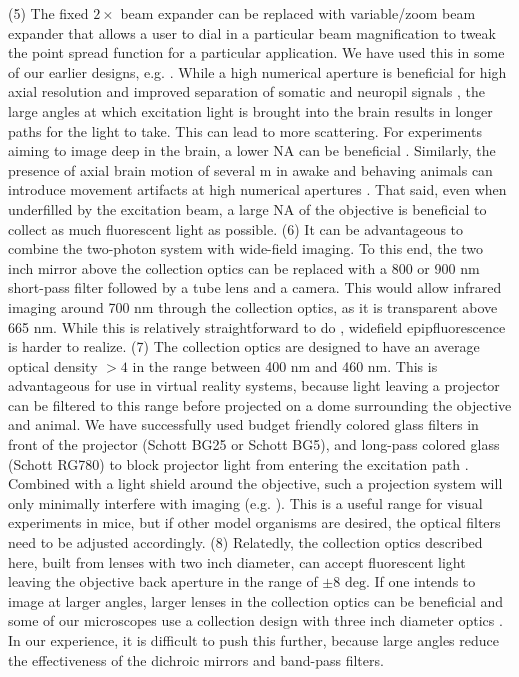 \documentclass[10pt,letterpaper]{article}
\begin{document}
(5) The fixed $2\times$ beam expander can be replaced with variable/zoom beam expander that allows a user to dial in a particular beam magnification to tweak the point spread function for a particular application\cite{Smith2019}. We have used this in some of our earlier designs, e.g. \cite{Song2017}. While a high numerical aperture is beneficial for high axial resolution and improved separation of somatic and neuropil signals \cite{Kerr2008, Gobel2007}, the large angles at which excitation light is brought into the brain results in longer paths for the light to take. This can lead to more scattering. For experiments aiming to image deep in the brain, a lower NA can be beneficial \cite{Tung2004}. Similarly, the presence of axial brain motion of several \textmu m in awake and behaving animals can introduce movement artifacts at high numerical apertures \cite{Dombeck2007}. That said, even when underfilled by the excitation beam, a large NA of the objective is beneficial to collect as much fluorescent light as possible.\newline
(6) It can be advantageous to combine the two-photon system with wide-field imaging. To this end, the two inch mirror above the collection optics can be replaced with a 800 or 900 nm short-pass filter followed by a tube lens and a camera. This would allow infrared imaging around 700 nm through the collection optics, as it is transparent above 665 nm. While this is relatively straightforward to do \cite{Rosenegger2014}, widefield epipfluorescence is harder to realize.\newline
(7) The collection optics are designed to have an average optical density $>4$ in the range between 400 nm and 460 nm. This is advantageous for use in virtual reality systems, because light leaving a projector can be filtered to this range before projected on a dome surrounding the objective and animal. We have successfully used budget friendly colored glass filters in front of the projector (Schott BG25 or Schott BG5), and long-pass colored glass (Schott RG780) to block projector light from entering the excitation path \cite{Dombeck2007}. Combined with a light shield around the objective, such a projection system will only minimally interfere with imaging (e.g. \cite{Nieh2021}). This is a useful range for visual experiments in mice, but if other model organisms are desired, the optical filters need to be adjusted accordingly.\newline
(8) Relatedly, the collection optics described here, built from lenses with two inch diameter, can accept fluorescent light leaving the objective back aperture in the range of $\pm 8\text{ deg}$. If one intends to image at larger angles, larger lenses in the collection optics can be beneficial \cite{Tsai2015} and some of our microscopes use a collection design with three inch diameter optics \cite{Song2017, Nieh2021}. In our experience, it is difficult to push this further, because large angles reduce the effectiveness of the dichroic mirrors and band-pass filters.\newline
\end{document}
